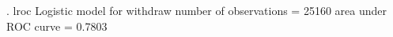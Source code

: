 . lroc
{\smallskip}
Logistic model for withdraw
{\smallskip}
number of observations =    25160
area under ROC curve   =   0.7803
{\smallskip}
